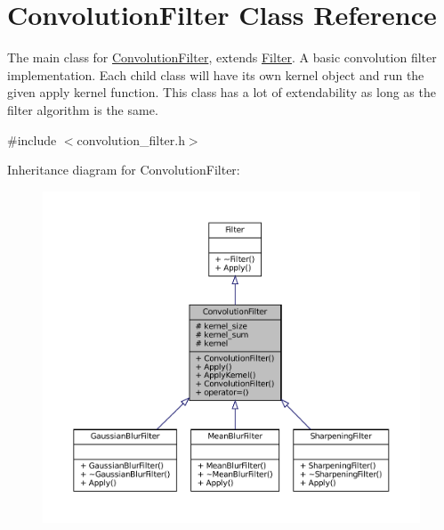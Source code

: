 \hypertarget{classConvolutionFilter}{}\section{Convolution\+Filter Class Reference}
\label{classConvolutionFilter}


The main class for \hyperlink{classConvolutionFilter}{Convolution\+Filter}, extends \hyperlink{classFilter}{Filter}. A basic convolution filter implementation. Each child class will have it\textquotesingle{}s own kernel object and run the given apply kernel function. This class has a lot of extendability as long as the filter algorithm is the same.  




{\ttfamily \#include $<$convolution\+\_\+filter.\+h$>$}



Inheritance diagram for Convolution\+Filter\+:\nopagebreak
\begin{figure}[H]
\begin{center}
\leavevmode
\includegraphics[width=350pt]{classConvolutionFilter__inherit__graph}
\end{center}
\end{figure}


